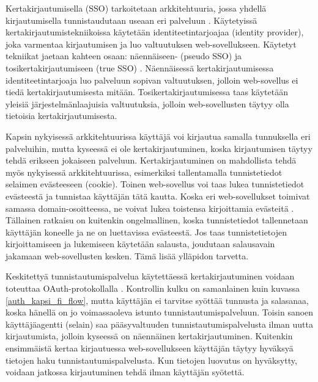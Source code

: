 Kertakirjautumisella (SSO) tarkoitetaan arkkitehtuuria, jossa yhdellä kirjautumisella tunnistaudutaan useaan eri palveluun \cite{sso}. Käytetyissä kertakirjautumistekniikoissa käytetään identiteetintarjoajaa (identity provider), joka varmentaa kirjautumisen ja luo valtuutuksen web-sovellukseen. Käytetyt tekniikat jaetaan kahteen osaan: näennäiseen- (pseudo SSO) ja tosikertakirjautumiseen (true SSO) \cite{sso}. Näennäisessä kertakirjautumisessa identiteetintarjoaja luo palveluun sopivan valtuutuksen, jolloin web-sovellus ei tiedä kertakirjautumisesta mitään. Tosikertakirjautumisessa taas käytetään yleisiä järjestelmänlaajuisia valtuutuksia, jolloin web-sovellusten täytyy olla tietoisia kertakirjautumisesta.

Kapsin nykyisessä arkkitehtuurissa käyttäjä voi kirjautua samalla tunnuksella eri palveluihin, mutta kyseessä ei ole kertakirjautuminen, koska kirjautumisen täytyy tehdä erikseen jokaiseen palveluun. Kertakirjautuminen on mahdollista tehdä myös nykyisessä arkkitehtuurissa, esimerkiksi tallentamalla tunnistetiedot selaimen evästeeseen (cookie). Toinen web-sovellus voi taas lukea tunnistetiedot evästeestä ja tunnistaa käyttäjän tätä kautta. Koska eri web-sovellukset toimivat samassa domain-osoitteessa, ne voivat lukea toistensa kirjoittamia evästeitä \cite{rfc6265}. Tällainen ratkaisu on kuitenkin ongelmallinen, koska tunnistetiedot tallennetaan käyttäjän koneelle ja ne on luettavissa evästeestä. Jos taas tunnistetietojen kirjoittamiseen ja lukemiseen käytetään salausta, joudutaan salausavain jakamaan web-sovellusten kesken. Tämä lisää ylläpidon tarvetta.

Keskitettyä tunnistautumispalvelua käytettäessä kertakirjautuminen voidaan toteuttaa OAuth-protokollalla \cite{distributed_web_security}. Kontrollin kulku on samanlainen kuin kuvassa \ref{auth_kapsi_fi_flow}, mutta käyttäjän ei tarvitse syöttää tunnusta ja salasanaa, koska hänellä on jo voimassaoleva istunto tunnistautumispalveluun. Toisin sanoen käyttäjäagentti (selain) saa pääsyvaltuuden tunnistautumispalvelusta ilman uutta kirjautumista, jolloin kyseessä on näennäinen kertakirjautuminen. Kuitenkin ensimmäistä kertaa kirjautuessa web-sovellukseen käyttäjän täytyy hyväksyä tietojen haku tunnistautumispalvelusta. Kun tietojen luovutus on hyväksytty, voidaan jatkossa kirjautuminen tehdä ilman käyttäjän syötettä.